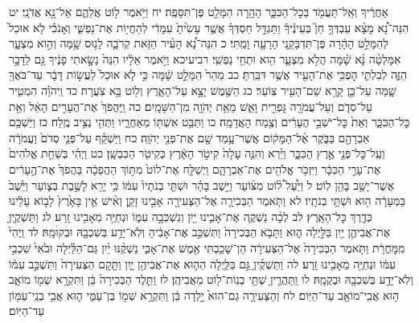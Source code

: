 \documentclass[twoside, openany, parskip=half, 11pt]{book}
\begin{document}
אַחֲרֶ֔יךָ וְאַֽל־תַּעֲמֹ֖ד בְּכׇל־הַכִּכָּ֑ר הָהָ֥רָה הִמָּלֵ֖ט פֶּן־תִּסָּפֶֽה׃ יח וַיֹּ֥אמֶר ל֖וֹט אֲלֵהֶ֑ם אַל־נָ֖א אֲדֹנָֽי׃ יט הִנֵּה־נָ֠א מָצָ֨א עַבְדְּךָ֣ חֵן֮ בְּעֵינֶ֒יךָ֒ וַתַּגְדֵּ֣ל חַסְדְּךָ֗ אֲשֶׁ֤ר עָשִׂ֙יתָ֙ עִמָּדִ֔י לְהַחֲי֖וֹת אֶת־נַפְשִׁ֑י וְאָנֹכִ֗י לֹ֤א אוּכַל֙ לְהִמָּלֵ֣ט הָהָ֔רָה פֶּן־תִּדְבָּקַ֥נִי הָרָעָ֖ה וָמַֽתִּי׃ כ הִנֵּה־נָ֠א הָעִ֨יר הַזֹּ֧את קְרֹבָ֛ה לָנ֥וּס שָׁ֖מָּה וְהִ֣וא מִצְעָ֑ר אִמָּלְטָ֨ה נָּ֜א שָׁ֗מָּה הֲלֹ֥א מִצְעָ֛ר הִ֖וא וּתְחִ֥י נַפְשִֽׁי׃ רביעיכא וַיֹּ֣אמֶר אֵלָ֔יו הִנֵּה֙ נָשָׂ֣אתִי פָנֶ֔יךָ גַּ֖ם לַדָּבָ֣ר הַזֶּ֑ה לְבִלְתִּ֛י הׇפְכִּ֥י אֶת־הָעִ֖יר אֲשֶׁ֥ר דִּבַּֽרְתָּ׃ כב מַהֵר֙ הִמָּלֵ֣ט שָׁ֔מָּה כִּ֣י לֹ֤א אוּכַל֙ לַעֲשׂ֣וֹת דָּבָ֔ר עַד־בֹּאֲךָ֖ שָׁ֑מָּה עַל־כֵּ֛ן קָרָ֥א שֵׁם־הָעִ֖יר צֽוֹעַר׃ כג הַשֶּׁ֖מֶשׁ יָצָ֣א עַל־הָאָ֑רֶץ וְל֖וֹט בָּ֥א צֹֽעֲרָה׃ כד וַֽיהֹוָ֗ה הִמְטִ֧יר עַל־סְדֹ֛ם וְעַל־עֲמֹרָ֖ה גׇּפְרִ֣ית וָאֵ֑שׁ מֵאֵ֥ת יְהֹוָ֖ה מִן־הַשָּׁמָֽיִם׃ כה וַֽיַּהֲפֹךְ֙ אֶת־הֶעָרִ֣ים הָאֵ֔ל וְאֵ֖ת כׇּל־הַכִּכָּ֑ר וְאֵת֙ כׇּל־יֹשְׁבֵ֣י הֶעָרִ֔ים וְצֶ֖מַח הָאֲדָמָֽה׃ כו וַתַּבֵּ֥ט אִשְׁתּ֖וֹ מֵאַחֲרָ֑יו וַתְּהִ֖י נְצִ֥יב מֶֽלַח׃ כז וַיַּשְׁכֵּ֥ם אַבְרָהָ֖ם בַּבֹּ֑קֶר אֶ֨ל־הַמָּק֔וֹם אֲשֶׁר־עָ֥מַד שָׁ֖ם אֶת־פְּנֵ֥י יְהֹוָֽה׃ כח וַיַּשְׁקֵ֗ף עַל־פְּנֵ֤י סְדֹם֙ וַעֲמֹרָ֔ה וְעַֽל־כׇּל־פְּנֵ֖י אֶ֣רֶץ הַכִּכָּ֑ר וַיַּ֗רְא וְהִנֵּ֤ה עָלָה֙ קִיטֹ֣ר הָאָ֔רֶץ כְּקִיטֹ֖ר הַכִּבְשָֽׁן׃ כט וַיְהִ֗י בְּשַׁחֵ֤ת אֱלֹהִים֙ אֶת־עָרֵ֣י הַכִּכָּ֔ר וַיִּזְכֹּ֥ר אֱלֹהִ֖ים אֶת־אַבְרָהָ֑ם וַיְשַׁלַּ֤ח אֶת־לוֹט֙ מִתּ֣וֹךְ הַהֲפֵכָ֔ה בַּהֲפֹךְ֙ אֶת־הֶ֣עָרִ֔ים אֲשֶׁר־יָשַׁ֥ב בָּהֵ֖ן לֽוֹט׃ ל וַיַּ֩עַל֩ ל֨וֹט מִצּ֜וֹעַר וַיֵּ֣שֶׁב בָּהָ֗ר וּשְׁתֵּ֤י בְנֹתָיו֙ עִמּ֔וֹ כִּ֥י יָרֵ֖א לָשֶׁ֣בֶת בְּצ֑וֹעַר וַיֵּ֙שֶׁב֙ בַּמְּעָרָ֔ה ה֖וּא וּשְׁתֵּ֥י בְנֹתָֽיו׃ לא וַתֹּ֧אמֶר הַבְּכִירָ֛ה אֶל־הַצְּעִירָ֖ה אָבִ֣ינוּ זָקֵ֑ן וְאִ֨ישׁ אֵ֤ין בָּאָ֙רֶץ֙ לָב֣וֹא עָלֵ֔ינוּ כְּדֶ֖רֶךְ כׇּל־הָאָֽרֶץ׃ לב לְכָ֨ה נַשְׁקֶ֧ה אֶת־אָבִ֛ינוּ יַ֖יִן וְנִשְׁכְּבָ֣ה עִמּ֑וֹ וּנְחַיֶּ֥ה מֵאָבִ֖ינוּ זָֽרַע׃ לג וַתַּשְׁקֶ֧יןָ אֶת־אֲבִיהֶ֛ן יַ֖יִן בַּלַּ֣יְלָה ה֑וּא וַתָּבֹ֤א הַבְּכִירָה֙ וַתִּשְׁכַּ֣ב אֶת־אָבִ֔יהָ וְלֹֽא־יָדַ֥ע בְּשִׁכְבָ֖הּ וּבְקוּׄמָֽהּ׃ לד וַֽיְהִי֙ מִֽמׇּחֳרָ֔ת וַתֹּ֤אמֶר הַבְּכִירָה֙ אֶל־הַצְּעִירָ֔ה הֵן־שָׁכַ֥בְתִּי אֶ֖מֶשׁ אֶת־אָבִ֑י נַשְׁקֶ֨נּוּ יַ֜יִן גַּם־הַלַּ֗יְלָה וּבֹ֙אִי֙ שִׁכְבִ֣י עִמּ֔וֹ וּנְחַיֶּ֥ה מֵאָבִ֖ינוּ זָֽרַע׃ לה וַתַּשְׁקֶ֜יןָ גַּ֣ם בַּלַּ֧יְלָה הַה֛וּא אֶת־אֲבִיהֶ֖ן יָ֑יִן וַתָּ֤קׇם הַצְּעִירָה֙ וַתִּשְׁכַּ֣ב עִמּ֔וֹ וְלֹֽא־יָדַ֥ע בְּשִׁכְבָ֖הּ וּבְקֻמָֽהּ׃ לו וַֽתַּהֲרֶ֛יןָ שְׁתֵּ֥י בְנֽוֹת־ל֖וֹט מֵאֲבִיהֶֽן׃ לז וַתֵּ֤לֶד הַבְּכִירָה֙ בֵּ֔ן וַתִּקְרָ֥א שְׁמ֖וֹ מוֹאָ֑ב ה֥וּא אֲבִֽי־מוֹאָ֖ב עַד־הַיּֽוֹם׃ לח וְהַצְּעִירָ֤ה גַם־הִוא֙ יָ֣לְדָה בֵּ֔ן וַתִּקְרָ֥א שְׁמ֖וֹ בֶּן־עַמִּ֑י ה֛וּא אֲבִ֥י בְנֵֽי־עַמּ֖וֹן עַד־הַיּֽוֹם׃
\end{document}
